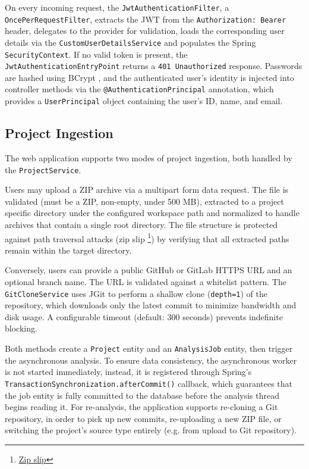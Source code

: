 On every incoming request, the \texttt{JwtAuthenticationFilter}, a \texttt{Once\-Per\-Re\-questFil\-ter}, extracts the JWT from the \texttt{Authorization: Bearer} header, delegates to the provider for validation, loads the corresponding user details via the \texttt{Cus\-tomU\-serDe\-tailsSer\-vice} and populates the Spring \texttt{ SecurityContext}. If no valid token is present, the \texttt{JwtAuthenticationEntryPoint} returns a \texttt{401 Un\-au\-thor\-ized} response. Passwords are hashed using BCrypt \cite{Provos1999}, and the authenticated user's identity is injected into controller methods via the \texttt{@Au\-then\-ti\-ca\-tionPrin\-ci\-pal} annotation, which provides a \texttt{UserPrincipal} object containing the user's ID, name, and email.

\subsection{Project Ingestion}
\label{subsec:project-ingestion}

\par The web application supports two modes of project ingestion, both handled by the \texttt{ProjectService}.

\par Users may upload a ZIP archive via a multipart form data request. The file is validated (must be a ZIP, non-empty, under 500 MB), extracted to a project specific directory under the configured workspace path and normalized to handle archives that contain a single root directory. The file structure is protected against path traversal attacks (zip slip \footnote{\href{https://maven.apache.org/security-plexus-archiver.html}{Zip slip}}) by verifying that all extracted paths remain within the target directory.

\par Conversely, users can provide a public GitHub or GitLab HTTPS URL and an optional branch name. The URL is validated against a whitelist pattern. The \texttt{Git\-Clone\-Ser\-vice} uses JGit to perform a shallow clone (\texttt{depth=1}) of the repository, which downloads only the latest commit to minimize bandwidth and disk usage. A configurable timeout (default: 300 seconds) prevents indefinite blocking.

Both methods create a \texttt{Project} entity and an \texttt{AnalysisJob} entity, then trigger the asynchronous analysis. To ensure data consistency, the asynchronous worker is not started immediately, instead, it is registered through Spring's \texttt{Tran\-sac\-tionSyn\-chron\-i\-zation.afterCommit()} callback, which guarantees that the job entity is fully committed to the database before the analysis thread begins reading it. For re-analysis, the application supports re-cloning a Git repository, in order to pick up new commits, re-uploading a new ZIP file, or switching the project's source type entirely (e.g. from upload to Git repository).

